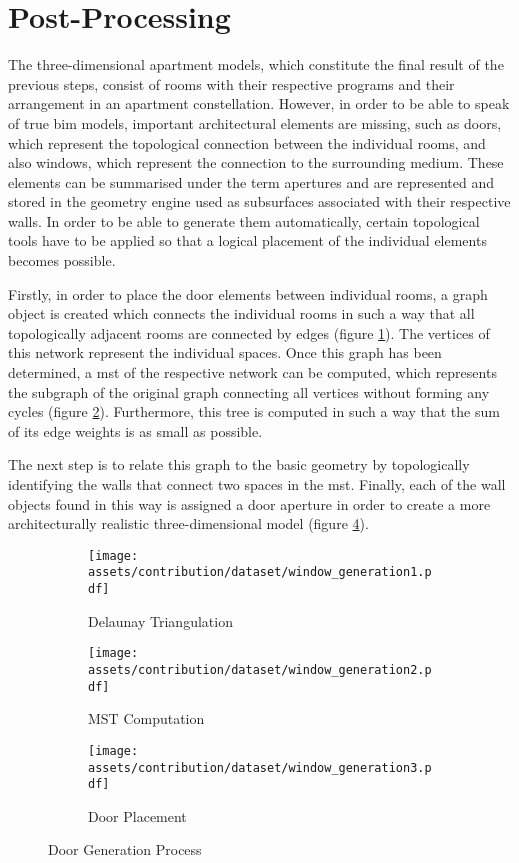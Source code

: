 \documentclass[a4paper, 12pt]{report}
\begin{document}
\section{Post-Processing}\label{sec:post-processing}

The three-dimensional apartment models, which constitute the final result of the previous steps, consist of rooms with their respective programs and their arrangement in an apartment constellation. However, in order to be able to speak of true \acrshort{bim} models, important architectural elements are missing, such as doors, which represent the topological connection between the individual rooms, and also windows, which represent the connection to the surrounding medium. These elements can be summarised under the term \glspl{aperture} and are represented and stored in the geometry engine used as subsurfaces associated with their respective walls. In order to be able to generate them automatically, certain topological tools have to be applied so that a logical placement of the individual elements becomes possible.

Firstly, in order to place the door elements between individual rooms, a graph object is created which connects the individual rooms in such a way that all topologically adjacent rooms are connected by edges (figure \ref{fig:delaunay-triangulation}). The vertices of this network represent the individual spaces. Once this graph has been determined, a \acrlong{mst} of the respective network can be computed, which represents the subgraph of the original graph connecting all vertices without forming any cycles (figure \ref{fig:mst-computation}). Furthermore, this tree is computed in such a way that the sum of its edge weights is as small as possible.

The next step is to relate this graph to the basic geometry by topologically identifying the walls that connect two spaces in the \acrlong{mst}. Finally, each of the wall objects found in this way is assigned a door \gls{aperture} in order to create a more architecturally realistic three-dimensional model (figure \ref{fig:door-generation-process}).

\begin{figure}
\centering
\begin{subfigure}{.33\textwidth}
\centering
\texttt{[image: assets/contribution/dataset/window\_generation1.pdf]}
\caption{Delaunay Triangulation}
\label{fig:delaunay-triangulation}
\end{subfigure}%
\begin{subfigure}{.33\textwidth}
\centering
\texttt{[image: assets/contribution/dataset/window\_generation2.pdf]}
\caption{MST Computation}
\label{fig:mst-computation}
\end{subfigure}%
\begin{subfigure}{.33\textwidth}
\centering
\texttt{[image: assets/contribution/dataset/window\_generation3.pdf]}
\caption{Door Placement}
\label{fig:door-placement}
\end{subfigure}
\caption{Door Generation Process}
\label{fig:door-generation-process}
\end{figure}
\end{document}
